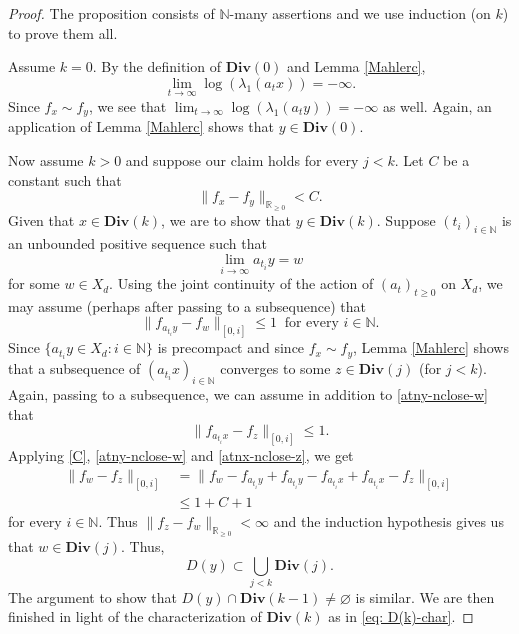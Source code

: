 \documentclass[reqno,11pt]{amsart}
\theoremstyle{plain}
\theoremstyle{definition}
\theoremstyle{remark}
\numberwithin{equation}{section}
\newcommand{\D}{\mathbf{Div}}
\newcommand{\R}{{\mathbb{R}}}
\newcommand{\N}{{\mathbb{N}}}
\begin{document}
\begin{proof}
The proposition consists of $\N$-many assertions and we use induction (on $k$) to prove them all.

Assume $k=0$. By the definition of $\D(0)$ and Lemma \ref{Mahlerc},
\begin{equation*}
    \lim_{t\to\infty} \log(\lambda_1(a_t x))  = -\infty.
\end{equation*}
Since $f_x \sim f_y$, we see that $\lim_{t\to \infty}\log(\lambda_1(a_t y)) = -\infty$ as well.
Again, an application of Lemma \ref{Mahlerc} shows that $y\in \D(0)$.

Now assume $k>0$ and suppose our claim holds for every $j<k$. Let $C$ be a constant such that 
\begin{equation}\label{C}
    \|f_x-f_y\|_{\R_{\geq 0}} < C.
\end{equation}
Given that $x\in \D(k)$, we are to show that $y \in \D(k)$. Suppose $(t_i)_{i \in \N}$ is an unbounded positive sequence such that
\begin{equation}
    \lim_{i \to \infty} a_{t_i}y = w
\end{equation}
for some $w \in X_d$.
Using the joint continuity of the action of $(a_t)_{t \geq 0}$ on $X_d$, we may assume (perhaps after passing to a subsequence) that
\begin{equation}\label{atny-nclose-w}
    \|f_{a_{t_i}y} - f_w\|_{[0,i]} \leq 1 \ \text{ for every } i \in \N.
\end{equation}
Since $\{a_{t_i} y \in X_d : i \in \N \}$ is precompact and since $f_x \sim f_y$, Lemma \ref{Mahlerc} shows that a subsequence of $(a_{t_i}x)_{i \in \N}$ converges to some $z \in \D(j)$ (for $j <k$).
Again, passing to a subsequence, we can assume in addition to \eqref{atny-nclose-w} that
\begin{equation}\label{atnx-nclose-z}
    \|f_{a_{t_i}x} - f_z\|_{[0,i]} \leq 1.
\end{equation}
Applying \eqref{C}, \eqref{atny-nclose-w} and \eqref{atnx-nclose-z}, we get
\begin{equation}
\begin{split}
    \|f_w - f_z\|_{[0,i]} &= \|f_w - f_{a_{t_i}y} + f_{a_{t_i}y} - f_{a_{t_i}x} + f_{a_{t_i}x} - f_z\|_{[0,i]}\\
    &\leq 1 + C + 1
    \end{split}
\end{equation}
for every $i \in \N$.
Thus $\|f_z - f_w\|_{\R_{\geq 0}} < \infty$ and the induction hypothesis gives us that $w \in \D(j)$. Thus,
\begin{equation*}
    D(y) \subset \bigcup_{j<k} \D(j).
\end{equation*}
The argument to show that $D(y) \cap \D(k-1) \neq \varnothing$ is similar.
We are then finished in light of the characterization of $\D(k)$ as in \eqref{eq: D(k)-char}.
\end{proof}
\end{document}
